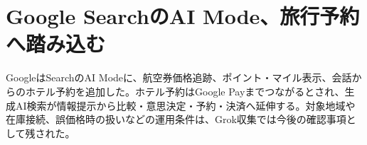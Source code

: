 \section{Google SearchのAI Mode、旅行予約へ踏み込む}
GoogleはSearchのAI Modeに、航空券価格追跡、ポイント・マイル表示、会話からのホテル予約を追加した。ホテル予約はGoogle Payまでつながるとされ、生成AI検索が情報提示から比較・意思決定・予約・決済へ延伸する。対象地域や在庫接続、誤価格時の扱いなどの運用条件は、Grok収集では今後の確認事項として残された。
